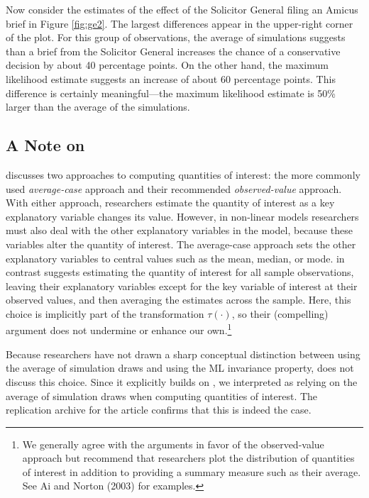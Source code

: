 \documentclass[11pt]{article}
\begin{document}
Now consider the estimates of the effect of the Solicitor General filing an Amicus brief in Figure \ref{fig:ge2}.
The largest differences appear in the upper-right corner of the plot.
For this group of observations, the average of simulations suggests than a brief from the Solicitor General increases the chance of a conservative decision by about 40 percentage points.
On the other hand, the maximum likelihood estimate suggests an increase of about 60 percentage points.
This difference is certainly meaningful---the maximum likelihood estimate is 50\% larger than the average of the simulations.

\subsection*{A Note on \cite{HanmerKalkan2013}}

\cite{HanmerKalkan2013} discusses two approaches to computing quantities of interest: the more commonly used {\it average-case} approach and their recommended {\it observed-value} approach.
With either approach, researchers estimate the quantity of interest as a key explanatory variable changes its value.
However, in non-linear models researchers must also deal with the other explanatory variables in the model, because these variables alter the quantity of interest.
The average-case approach sets the other explanatory variables to central values such as the mean, median, or mode.
\cite{HanmerKalkan2013} in contrast suggests estimating the quantity of interest for all sample observations, leaving their explanatory variables except for the key variable of interest at their observed values, and then averaging the estimates across the sample.
Here, this choice is implicitly part of the transformation $\tau(\cdot)$, so their (compelling) argument does not undermine or enhance our own.\footnote{We generally agree with the arguments in favor of the observed-value approach but recommend that researchers plot the distribution of quantities of interest in addition to providing a summary measure such as their average.
See Ai and Norton (2003) for examples.}

Because researchers have not drawn a sharp conceptual distinction between using the average of simulation draws and using the ML invariance property, \cite{HanmerKalkan2013} does not discuss this choice.
Since it explicitly builds on \cite{KingTomzWittenberg2000}, we interpreted \cite{HanmerKalkan2013} as relying on the average of simulation draws when computing quantities of interest.
The replication archive for the article confirms that this is indeed the case.
\end{document}
